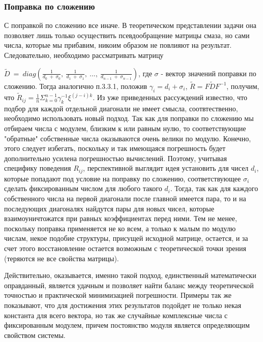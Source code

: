 \documentclass[a4paper]{article}
\theoremstyle{definition}
\begin{document}
    \subsubsection{Поправка по сложению}


    С поправкой по сложению все иначе. В теоретическом представлении задачи она позволяет лишь только осуществить псевдообращение матрицы смаза, но сами числа, которые мы прибавим, никоим образом не повлияют на результат. Следовательно, необходимо рассматривать матрицу

$\tilde{D}~=~diag(\frac{1}{d_0~+~\sigma_0},~\frac{1}{d_1~+~\sigma_1},~...,~\frac{1}{d_{n-1}~+~\sigma_{n-1}})$, где $\sigma$ - вектор значений поправки по сложению. Тогда аналогично п.3.3.1, положив $\gamma_i = d_i + \sigma_i$, $\tilde{R} = F\tilde{D}F^{-1}$, получим, что $\tilde{R}_{ij} = \frac{1}{n}\Sigma_{k=0}^{n-1} \gamma_k^{-1} \xi^{(j-i)k}$. Из уже приведенных рассуждений известно, что подбор для каждой отдельной диагонали не имеет смысла, соотвтественно, необходимо использовать новый подход. Так как для поправки по сложению мы отбираем числа с модулем, близким к или равным нулю, то соответствующие "обратные" собственные числа оказываются очень велики по модулю. Конечно, этого следует избегать, поскольку и так имеющаяся погрешность будет дополнительно усилена погрешностью вычислений. Поэтому, учитывая специфику поведения $R_{ij}$, перспективной выглядит идея установить для чисел $d_i$, которые попадают под условие на поправку по сложению, соответствующее $\sigma_i$ сделать фиксированным числом для любого такого $d_i$. Тогда, так как для каждого собственного числа на первой диагонали после главной имеется пара, то и на последующих диагоналях найдутся пары для новых чисел, которые взаимоуничтожатся при равных коэффициентах перед ними.  Тем не менее, поскольку поправка применяется не ко всем, а только к малым по модулю числам, некое подобие структуры, присущей исходной матрице, остается, и за счет этого восстановление остается возможным с теоретической точки зрения (теряются не все свойства матрицы).


    Действительно, оказывается, именно такой подход, единственный математически оправданный, является удачным и позволяет найти баланс между теоретической точностью и практической минимизацией погрешности. Примеры так же показывают, что для достижения этих результатов подойдет не только некая константа для всего вектора, но так же случайные комплексные числа с фиксированным модулем, причем постоянство модуля является определяющим свойством системы.
\end{document}
